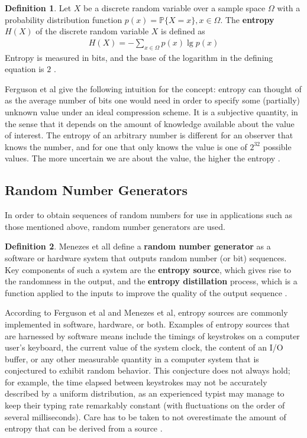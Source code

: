 \documentclass[12pt, titlepage]{report}
\theoremstyle{definition}
\newtheorem{definition}{Definition}
\begin{document}
\begin{definition}
Let $X$ be a discrete random variable over a sample space $\Omega$ with a probability distribution function $p(x)=\mathbb{P}\{X=x\}, x\in\Omega$.  The \textbf{entropy} $H(X)$ of the discrete random variable $X$ is defined as
\begin{gather}\label{eq:entropy}
H(X) = -\sum_{x\in\Omega} p(x) \lg p(x)
\end{gather}
Entropy is measured in bits, and the base of the logarithm in the defining equation is $2$ \cite[p. 12-13]{cover2012elements}.
\end{definition}

Ferguson et al give the following intuition for the concept: entropy can thought of as the average number of bits one would need in order to specify some (partially) unknown value under an ideal compression scheme. It is a subjective quantity, in the sense that it depends on the amount of knowledge available about the value of interest. The entropy of an arbitrary number is different for an observer that knows the number, and for one that only knows the value is one of $2^{32}$ possible values. The more uncertain we are about the value, the higher the entropy \cite[p. 137]{ferguson2010cryptography}.



\subsection{Random Number Generators}
In order to obtain sequences of random numbers for use in applications such as those mentioned above, random number generators are used.

\begin{definition}
Menezes et all define a \textbf{random number generator} as a software or hardware system that outputs random number (or bit) sequences. Key components of such a system are the \textbf{entropy source}, which gives rise to the randomness in the output, and the \textbf{entropy distillation} process, which is a function applied to the inputs to improve the quality of the output sequence \cite{menezes1996handbook}.
\end{definition}

According to Ferguson et al and Menezes et al, entropy sources are commonly implemented in software, hardware, or both. Examples of entropy sources that are harnessed by software means include the timings of keystrokes on a computer user's keyboard, the current value of the system clock, the content of an I/O buffer, or any other measurable quantity in a computer system that is conjectured to exhibit random behavior. This conjecture does not always hold; for example, the time elapsed between keystrokes may not be accurately described by a uniform distribution, as an experienced typist may manage to keep their typing rate remarkably constant (with fluctuations on the order of several milliseconds). Care has to be taken to not overestimate the amount of entropy that can be derived from a source \cite[p. 138-139]{ferguson2010cryptography} \cite[p. 171-172]{menezes1996handbook}.
\end{document}
